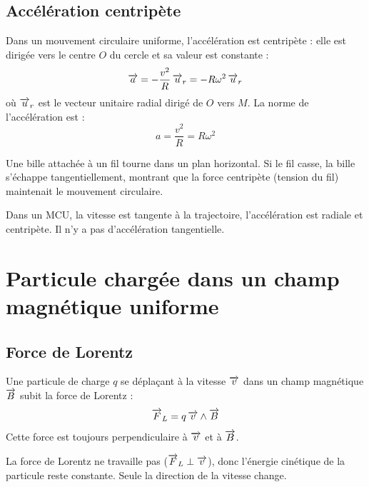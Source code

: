 \subsection{Accélération centripète}

\begin{loi}
Dans un mouvement circulaire uniforme, l'accélération est centripète : elle est dirigée vers le centre $O$ du cercle et sa valeur est constante :
\[
\overrightarrow{a} = -\frac{v^2}{R}\,\overrightarrow{u}_r = -R\omega^2\,\overrightarrow{u}_r
\]
où $\overrightarrow{u}_r$ est le vecteur unitaire radial dirigé de $O$ vers $M$. La norme de l'accélération est :
\[
a = \frac{v^2}{R} = R\omega^2
\]
\end{loi}

\begin{experience}
Une bille attachée à un fil tourne dans un plan horizontal. Si le fil casse, la bille s'échappe tangentiellement, montrant que la force centripète (tension du fil) maintenait le mouvement circulaire.
\end{experience}

\begin{aretenir}
Dans un MCU, la vitesse est tangente à la trajectoire, l'accélération est radiale et centripète. Il n'y a pas d'accélération tangentielle.
\end{aretenir}

\section{Particule chargée dans un champ magnétique uniforme}

\subsection{Force de Lorentz}

\begin{loi}
Une particule de charge $q$ se déplaçant à la vitesse $\overrightarrow{v}$ dans un champ magnétique $\overrightarrow{B}$ subit la force de Lorentz :
\[
\overrightarrow{F}_L = q\,\overrightarrow{v} \wedge \overrightarrow{B}
\]
Cette force est toujours perpendiculaire à $\overrightarrow{v}$ et à $\overrightarrow{B}$.
\end{loi}

\begin{propriete}
La force de Lorentz ne travaille pas ($\overrightarrow{F}_L \perp \overrightarrow{v}$), donc l'énergie cinétique de la particule reste constante. Seule la direction de la vitesse change.
\end{propriete}

